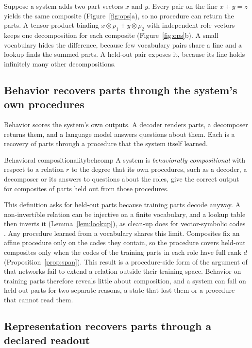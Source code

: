 \documentclass[10pt]{article}
\theoremstyle{plain}
\theoremstyle{remark}
\begin{document}
Suppose a system adds two part vectors $x$ and $y$. Every pair on the line $x + y = z$ yields the same composite (Figure~\ref{fig:ops}a), so no procedure can return the parts. A tensor-product binding $x \otimes \rho_1 + y \otimes \rho_2$ with independent role vectors keeps one decomposition for each composite (Figure~\ref{fig:ops}b). A small vocabulary hides the difference, because few vocabulary pairs share a line and a lookup finds the summed parts. A held-out pair exposes it, because its line holds infinitely many other decompositions.

\subsection{Behavior recovers parts through the system's own procedures}
\label{sec:notions}

Behavior scores the system's own outputs. A decoder renders parts, a decomposer returns them, and a language model answers questions about them. Each is a recovery of parts through a procedure that the system itself learned.

\begin{defbox}{Behavioral compositionality}{behcomp}
A system is \emph{behaviorally compositional} with respect to a relation $r$ to the degree that its own procedures, such as a decoder, a decomposer or its answers to questions about the roles, give the correct output for composites of parts held out from those procedures.
\end{defbox}

This definition asks for held-out parts because training parts decode anyway. A non-invertible relation can be injective on a finite vocabulary, and a lookup table then inverts it (Lemma~\ref{lem:lookup}), as clean-up does for vector-symbolic codes \citep{plate2003,frady2018}. Any procedure learned from a vocabulary shares this limit. Composites fix an affine procedure only on the codes they contain, so the procedure covers held-out composites only when the codes of the training parts in each role have full rank $d$ (Proposition~\ref{prop:span}). This result is a procedure-side form of the argument of \citet{marcus1998} that networks fail to extend a relation outside their training space. Behavior on training parts therefore reveals little about composition, and a system can fail on held-out parts for two separate reasons, a state that lost them or a procedure that cannot read them.

\subsection{Representation recovers parts through a declared readout}
\label{sec:repcomp}
\end{document}
